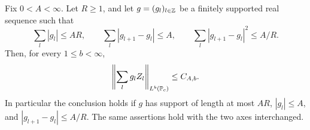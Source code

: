 \begin{lemma}\label{lem:ordinary-moments}
Fix \(0<A<\infty\). Let \(R\ge1\), and let \(g=(g_l)_{l\in\Z}\) be a
finitely supported real sequence such that
\begin{equation}\label{eq:prob-g-conditions}
 \sum_l|g_l|\le AR,\qquad
 \sum_l|g_{l+1}-g_l|\le A,\qquad
 \sum_l|g_{l+1}-g_l|^2\le A/R.
\end{equation}
Then, for every \(1\le b<\infty\),
\begin{equation}\label{eq:prob-ordinary-moments}
 \left\|\sum_lg_lZ_l\right\|_{L^b(\P_c)}\le C_{A,b}.
\end{equation}
In particular the conclusion holds if \(g\) has support of length at
most \(AR\), \(|g_l|\le A\), and
\(|g_{l+1}-g_l|\le A/R\). The same assertions hold with the two axes
interchanged.
\end{lemma}

